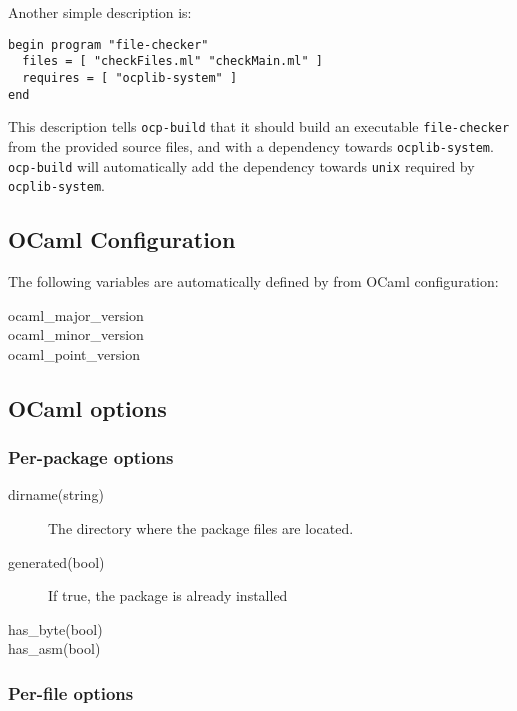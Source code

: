 Another simple description is:

\begin{verbatim}
begin program "file-checker"
  files = [ "checkFiles.ml" "checkMain.ml" ]
  requires = [ "ocplib-system" ]
end
\end{verbatim}

This description tells {\tt ocp-build} that it should build an
executable {\tt file-checker} from the provided source files, and with
a dependency towards {\tt ocplib-system}. {\tt ocp-build} will
automatically add the dependency towards {\tt unix} required by {\tt
  ocplib-system}.

\subsection{OCaml Configuration}

The following variables are automatically defined by
\ocpbuild{} from OCaml configuration:
\begin{description}
\item[ocaml\_major\_version]
\item[ocaml\_minor\_version]
\item[ocaml\_point\_version]
\end{description}

\subsection{OCaml options}

\subsubsection{Per-package options}

\begin{description}
\item[dirname(string)] The directory where the package files are located.
\item[generated(bool)] If true, the package is already installed
\item[has\_byte(bool)]
\item[has\_asm(bool)]
\end{description}

\subsubsection{Per-file options}



